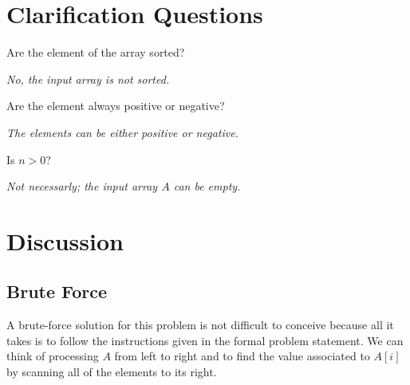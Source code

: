 \section{Clarification Questions}

\begin{QandA}
	\item \begin{questionitem} \begin{question} Are the element of the array sorted?  \end{question} 	 
    \begin{answered}
		\textit{No, the input array is not sorted.}
	\end{answered} \end{questionitem}
	
	\item \begin{questionitem} \begin{question} Are the element always positive or negative?  \end{question} 	 
    \begin{answered}
		\textit{The elements can be either positive or negative.}
	\end{answered} \end{questionitem}

	\item \begin{questionitem} \begin{question} Is $n>0$?  \end{question} 	 
		\begin{answered}
			\textit{Not necessarly; the input  array $A$ can be empty.}
		\end{answered} \end{questionitem}
	
\end{QandA}

\section{Discussion}

\subsection{Brute Force}
A brute-force solution for this problem is not difficult to conceive because all it takes is to follow the instructions given in the formal problem statement. 
We can think of processing $A$ from left to right and to find the value associated to $A[i]$ by scanning all of the elements to its right. 



